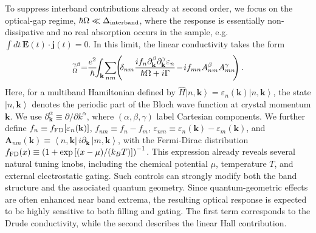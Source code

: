 \documentclass[twocolumn,aps,prb,superscriptaddress,longbibliography]{revtex4-2}
\renewcommand{\epsilon}{\varepsilon}
\newcommand{\bra}[1]{\left\langle #1 \right|}
\newcommand{\ket}[1]{\left|#1\right\rangle}
\begin{document}
To suppress interband contributions already at second order, we focus on the optical-gap regime, $\hbar\Omega \ll \Delta_{\rm interband}$, where the response is essentially non-dissipative and no real absorption occurs in the sample, e.g. $\int dt\, \mathbf E(t)\cdot \mathbf j(t)=0$. In this limit, the linear conductivity takes the form
\begin{equation}
    [\hat{\sigma}^{(1)}]^{\gamma \beta}_{\Omega} \hspace{-1mm}=\hspace{-1mm}\frac{e^2}{\hbar}\hspace{-1.5mm}\int_\mathbf{k}\hspace{-0.5mm}\sum_{nm}\hspace{-1mm}\left(\hspace{-1mm}\delta_{nm}\frac{i f_n \partial^\beta_\mathbf{k} \partial^\gamma_\mathbf{k} \epsilon_n}{\hbar\Omega+i\Gamma}\hspace{-0.5mm}-\hspace{-0.5mm}i f_{mn} A^\beta_{nm} A^\gamma_{mn}\hspace{-1mm}\right).
\end{equation}
Here, for a multiband Hamiltonian defined by $\hat H \ket{n,\mathbf{k}} = \epsilon_n(\mathbf{k}) \ket{n,\mathbf{k}}$, the state $\ket{n,\mathbf{k}}$ denotes the periodic part of the Bloch wave function at crystal momentum $\mathbf{k}$. We use $\partial^\alpha_\mathbf{k}\equiv \partial/\partial k^\alpha$, where $(\alpha,\beta,\gamma)$ label Cartesian components. We further define $f_n \equiv f_{\rm FD}[\epsilon_n(\mathbf{k})]$, $f_{nm} \equiv f_n-f_m$, $\epsilon_{nm} \equiv \epsilon_n(\mathbf{k})-\epsilon_m(\mathbf{k})$, and $\mathbf A_{nm}(\mathbf{k}) \equiv \bra{n,\mathbf{k}}\, i\partial_{\mathbf{k}} \,\ket{m,\mathbf{k}}$, with the Fermi-Dirac distribution $f_{\rm FD}(x) \equiv \left(1+\exp\left[{(x-\mu)}/({k_B T})\right]\right)^{-1}$. This expression already reveals several natural tuning knobs, including the chemical potential $\mu$, temperature $T$, and external electrostatic gating. Such controls can strongly modify both the band structure and the associated quantum geometry. Since quantum-geometric effects are often enhanced near band extrema, the resulting optical response is expected to be highly sensitive to both filling and gating. The first term corresponds to the Drude conductivity, while the second describes the linear Hall contribution.
\end{document}
